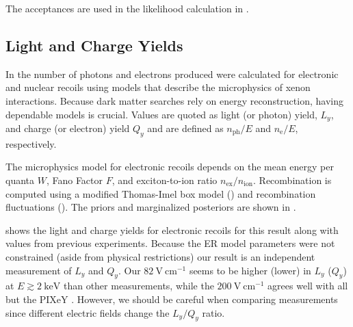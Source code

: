 The acceptances are used in the likelihood calculation in .



\subsection{Light and Charge Yields}
\label{subsec:er_nr_calibrations_results_ly_qy}
In  the number
of photons and electrons produced were calculated for electronic and nuclear recoils using models that describe
the microphysics of xenon interactions.  Because dark matter searches rely on energy reconstruction, having dependable models is
crucial.  Values are quoted as light (or photon) yield, $L_y$, and charge (or electron) yield $Q_y$ and are defined as
$n_{\mathrm{ph}}/E$ and $n_{\mathrm{e}} / E$, respectively.

The microphysics model for electronic recoils depends on the mean energy
per quanta $W$, Fano Factor $F$, and exciton-to-ion ratio $n_{\mathrm{ex}} / n_{\mathrm{ion}}$.  Recombination is computed using
a modified Thomas-Imel box model () and recombination fluctuations
().  The priors and marginalized posteriors are shown in
.

 shows the light and
charge yields for electronic recoils for this result along with values from previous experiments.  Because the ER model parameters were
not constrained (aside from physical restrictions) our result is an independent measurement of $L_y$ and $Q_y$.  Our
$82\ \mathrm{V\ cm^{-1}}$ seems to be higher (lower) in $L_y$ ($Q_y$) at $E \gtrsim 2\ \mathrm{keV}$ than
other measurements, while the $200\ \mathrm{V\ cm^{-1}}$ agrees well with all but the PIXeY .  However, we should be careful
when comparing measurements since different electric fields change the $L_y/Q_y$ ratio.

